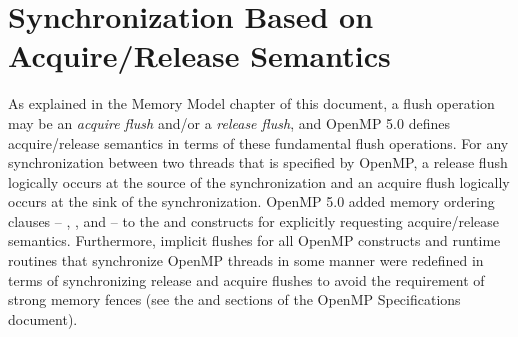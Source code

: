 \pagebreak
\section{Synchronization Based on Acquire/Release Semantics}
\label{sec:acquire_and_release_semantics}



As explained in the Memory Model chapter of this document, a flush operation
may be an \emph{acquire flush} and/or a \emph{release flush}, and OpenMP 5.0
defines acquire/release semantics in terms of these fundamental flush
operations.  For any synchronization between two threads that is specified by
OpenMP, a release flush logically occurs at the source of the synchronization
and an acquire flush logically occurs at the sink of the synchronization.
OpenMP 5.0 added memory ordering clauses -- , , and
 -- to the  and  constructs for
explicitly requesting acquire/release semantics.  Furthermore, implicit flushes
for all OpenMP constructs and runtime routines that synchronize OpenMP threads
in some manner were redefined in terms of synchronizing release and acquire
flushes to avoid the requirement of strong memory fences (see the  and  sections of the
OpenMP Specifications document).

